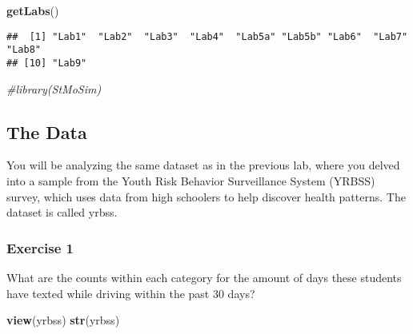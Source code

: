 \documentclass[
]{article}
\newenvironment{Shaded}{\begin{snugshade}}{\end{snugshade}}
\newcommand{\CommentTok}[1]{\textcolor[rgb]{0.56,0.35,0.01}{\textit{#1}}}
\newcommand{\KeywordTok}[1]{\textcolor[rgb]{0.13,0.29,0.53}{\textbf{#1}}}
\newcommand{\NormalTok}[1]{#1}
\begin{document}
\begin{Shaded}
\begin{Highlighting}[]
\KeywordTok{getLabs}\NormalTok{()}
\end{Highlighting}
\end{Shaded}

\begin{verbatim}
##  [1] "Lab1"  "Lab2"  "Lab3"  "Lab4"  "Lab5a" "Lab5b" "Lab6"  "Lab7"  "Lab8" 
## [10] "Lab9"
\end{verbatim}

\begin{Shaded}
\begin{Highlighting}[]
\CommentTok{#library(StMoSim)}
\end{Highlighting}
\end{Shaded}

\hypertarget{the-data}{%
\subsection{The Data}\label{the-data}}

You will be analyzing the same dataset as in the previous lab, where you
delved into a sample from the Youth Risk Behavior Surveillance System
(YRBSS) survey, which uses data from high schoolers to help discover
health patterns. The dataset is called yrbss.

\hypertarget{exercise-1}{%
\subsubsection{Exercise 1}\label{exercise-1}}

What are the counts within each category for the amount of days these
students have texted while driving within the past 30 days?

\begin{Shaded}
\begin{Highlighting}[]
\KeywordTok{view}\NormalTok{(yrbss)}
\KeywordTok{str}\NormalTok{(yrbss)}
\end{Highlighting}
\end{Shaded}
\end{document}
